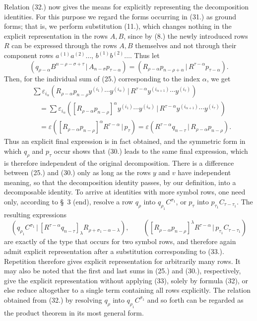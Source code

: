 \documentclass[11pt]{article}
\providecommand{\pair}[2]{(#1\,|\,#2)}
\providecommand{\eps}{\varepsilon}
\begin{document}
Relation (32.) now gives the means for explicitly representing the decomposition identities. For this purpose we regard the forms occurring in (31.) as ground forms; that is, we perform substitution (11.), which changes nothing in the explicit representation in the rows $A,B$, since by (8.) the newly introduced rows $R$ can be expressed through the rows $A,B$ themselves and not through their component rows $a^{(1)}a^{(2)}\ldots$, $b^{(1)}b^{(2)}\ldots$. Thus let
\begin{equation}
 \pair{q_{\rho-\alpha}B^{n-\rho-\sigma+\tau}}{A_{n-\sigma}p_{\tau-\alpha}}
 =\pair{R_{\rho-\alpha}p_{n-\rho+\alpha}}{R^{\tau-\alpha}p_{\tau-\alpha}}.
\tag{33}
\end{equation}
Then, for the individual sum of (25.) corresponding to the index $\alpha$, we get
\begin{equation}
\begin{aligned}
&\sum \eps_{i_\alpha}\pair{R_{\rho-\alpha}p_{n-\rho}y^{(i_1)}\cdots y^{(i_\alpha)}}{R^{\tau-\alpha}y^{(i_{\alpha+1})}\cdots y^{(i_\tau)}}\\
&\quad=\sum \eps_{i_\alpha}\pair{[R_{\rho-\alpha}p_{n-\rho}]^\alpha y^{(i_1)}\cdots y^{(i_\alpha)}}{R^{\tau-\alpha}y^{(i_{\alpha+1})}\cdots y^{(i_\tau)}}\\
&\quad=\eps\pair{[R_{\rho-\alpha}p_{n-\rho}]^\alpha R^{\tau-\alpha}}{p_\tau}
 =\eps\pair{R^{\tau-\alpha}q_{n-\tau}}{R_{\rho-\alpha}p_{n-\rho}}.
\end{aligned}
\tag{34}
\end{equation}
Thus an explicit final expression is in fact obtained, and the symmetric form in which $q_\rho$ and $p_\tau$ occur shows that (30.) leads to the same final expression, which is therefore independent of the original decomposition. There is a difference between (25.) and (30.) only as long as the rows $y$ and $v$ have independent meaning, so that the decomposition identity passes, by our definition, into a decomposable identity. To arrive at identities with more symbol rows, one need only, according to \S\ 3 (end), resolve a row $q_\rho$ into $q_{\rho_1}C^{\sigma_1}$, or $p_\tau$ into $p_{\tau_1}C_{\tau-\tau_1}$. The resulting expressions
\begin{equation}
 \pair{q_{\rho_1}C^{\sigma_1}}{[R^{\tau-\alpha}q_{n-\tau}]_\lambda R_{\rho+\sigma_1-\alpha-\lambda}},
 \qquad
 \pair{[R_{\rho-\alpha}p_{n-\rho}]^\lambda R^{\tau-\alpha}}{p_{\tau_1}C_{\tau-\tau_1}}
\tag{35}
\end{equation}
are exactly of the type that occurs for two symbol rows, and therefore again admit explicit representation after a substitution corresponding to (33.). Repetition therefore gives explicit representation for arbitrarily many rows. It may also be noted that the first and last sums in (25.) and (30.), respectively, give the explicit representation without applying (33), solely by formula (32), or else reduce altogether to a single term containing all rows explicitly. The relation obtained from (32.) by resolving $q_\rho$ into $q_{\rho_1}C^{\sigma_1}$ and so forth can be regarded as the product theorem in its most general form.
\end{document}

